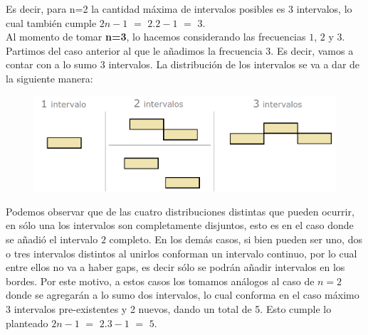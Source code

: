 Es decir, para n=2 la cantidad m\'axima de intervalos posibles es $3$ intervalos, lo cual tambi\'en cumple $2n-1$ $=$ $2$.$2-1$ $=$ $3$.\\
 

Al momento de tomar \textbf{n=3}, lo hacemos considerando las frecuencias $1$, $2$ y $3$. Partimos del caso anterior al que le a\~nadimos la frecuencia $3$. Es decir, vamos a contar con a lo sumo $3$ intervalos. La distribuci\'on de los intervalos se va a dar de la siguiente manera:\\

  \begin{figure}[h!]
   \begin{center}
 	\includegraphics[scale=0.45]{imagenes/ej2/secuencias/salida2.png}
   \end{center}
 \end{figure}

Podemos observar que de las cuatro distribuciones distintas que pueden ocurrir, en s\'olo una los intervalos son completamente disjuntos, esto es en el caso donde se a\~nadi\'o el intervalo $2$ completo. En los dem\'as casos, si bien pueden ser uno, dos o tres intervalos distintos al unirlos conforman un intervalo continuo, por lo cual entre ellos no va a haber gaps, es decir s\'olo se podr\'an a\~nadir intervalos en los bordes. Por este motivo, a estos casos los tomamos an\'alogos al caso de $n=2$ donde se agregar\'an a lo sumo dos intervalos, lo cual conforma en el caso m\'aximo 3 intervalos pre-existentes y 2 nuevos, dando un total de 5. Esto cumple lo planteado $2n-1$ $=$ $2$.$3-1$ $=$ $5$.\\


